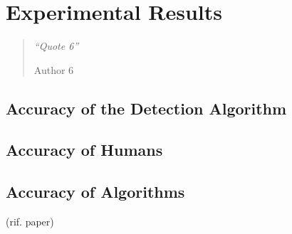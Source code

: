 \chapter{Experimental Results}
\label{chapter6}
\thispagestyle{empty}

\begin{quotation}
{\footnotesize
\noindent\emph{``Quote 6''}
\begin{flushright}
Author 6
\end{flushright}
}
\end{quotation}

\vspace{0.5cm}


\section{Accuracy of the Detection Algorithm}

\vspace{0.5cm}

\section{Accuracy of Humans}

\vspace{0.5cm}

\section{Accuracy of Algorithms}

(rif. paper)